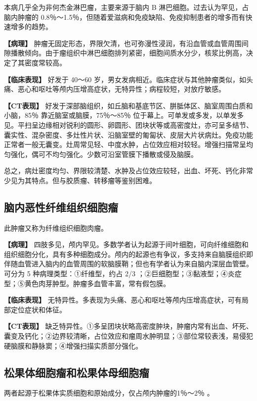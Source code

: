 本病几乎全为非何杰金淋巴瘤，主要来源于脑内 B
淋巴细胞。过去认为罕见，占脑内肿瘤的
0.8％～1.5％，但随着爱滋病和免疫缺陷、免疫抑制患者的增多而有快速增多的趋势。

\textbf{【病理】}
肿瘤无固定形态，界限欠清，也可弥漫性浸润，有沿血管或血管周围间隙播散倾向。由于瘤组织中淋巴细胞排列紧密，细胞间质水分少，核浆比例高，决定了其密度常较高。

\textbf{【临床表现】} 好发于 40～60
岁，男女发病相近。临床症状与其他肿瘤类似，如头痛、恶心和呕吐等颅内压增高症状，无特异性；病程较短，对放疗敏感。

\textbf{【CT表现】}
好发于深部脑组织，如丘脑和基底节区、胼胝体区、脑室周围白质和小脑，85％
靠近脑室或脑膜，75％～85％
位于幕上。可单发或多发，以单发多见。平扫呈边缘相对锐利的圆形、卵圆形、团块状等或高密度灶，亦可呈多结节、囊实性、混杂密度、多灶性片状、沿脑室壁的匍匐状、皮层大片状病灶。免疫功能正常者一般无囊变。灶周常见轻、中度水肿，占位效应相对较轻。增强扫描常呈均匀强化，偶可不均匀强化。少数可沿室管膜下播散或侵及脑膜。

总之，病灶密度均匀、界限较清楚、水肿及占位效应较轻，出血、坏死、钙化非常少见为其特点。但与胶质瘤、转移瘤等鉴别困难。

\subsection{脑内恶性纤维组织细胞瘤}

此肿瘤又称为纤维组织细胞肉瘤。

\textbf{【病理】}
四肢多见，颅内罕见。多数学者认为起源于间叶细胞，可向纤维细胞和组织细胞分化，具有多种细胞成分。颅内的起源也有争议，多支持来自脑膜组织即伴随血管进入脑内的血管周围的软脑膜鞘；但也有学者认为来自脑内深层血管壁。可分为
5 种病理类型：①纤维型，约占 2/3
；②巨细胞型；③黏液型；④炎症型；⑤黄色肉芽肿型。肿瘤多血管丰富，常有假包膜。

\textbf{【临床表现】}
无特异性。多表现为头痛、恶心和呕吐等颅内压增高症状，可有局部定位症状和体征。

\textbf{【CT表现】}
缺乏特异性。①多呈团块状略高密度肿块，肿瘤内常有出血、坏死、囊变及钙化；②边界较清晰，占位效应和瘤周水肿明显；③部位常较表浅，易侵犯硬脑膜和静脉窦；④增强扫描实质部分强化。

\subsection{松果体细胞瘤和松果体母细胞瘤}

两者起源于松果体实质细胞和原始成分，仅占颅内肿瘤的1％～2％ 。

